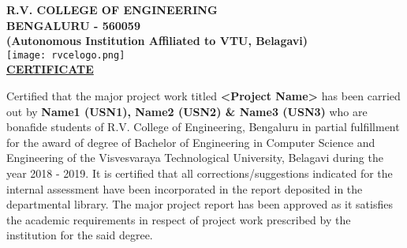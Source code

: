 \begin{center}
	\textbf {
		\Large R.V. COLLEGE OF ENGINEERING\\
		\Large BENGALURU - 560059\\
		\small(Autonomous Institution Affiliated to VTU, Belagavi)\\[0.3cm]
	}
	\texttt{[image: rvcelogo.png]}\\[0.3cm]
		\Large \textbf{\underline {CERTIFICATE}}\\
\end{center}
\linespread{1.2}\normalsize \begin{center} \justify
Certified that the major project work titled \textbf{<Project Name>} has been carried out by \textbf{Name1 (USN1), Name2 (USN2) \& Name3 (USN3)} who are bonafide students of R.V. College of Engineering, Bengaluru in partial fulfillment for the award of degree of Bachelor of Engineering in Computer Science and Engineering of the Visvesvaraya Technological University, Belagavi during the year 2018 - 2019. It is certified that all corrections/suggestions indicated for the internal assessment have been incorporated in the report deposited in the departmental library. The major project report has been approved as it satisfies the academic requirements in respect of project work prescribed by the institution for the said degree.
\end{center}
\linespread{1}
